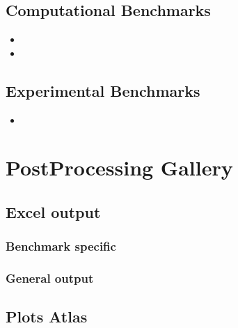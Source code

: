 \documentclass[letterpaper,10pt,english]{sphinxmanual}
\begin{document}
\section{Computational Benchmarks}
\label{\detokenize{benchmarks/benchmarks:computational-benchmarks}}\begin{itemize}
\item {} 

\item {} 

\end{itemize}


\section{Experimental Benchmarks}
\label{\detokenize{benchmarks/benchmarks:experimental-benchmarks}}\begin{itemize}
\item {} 

\end{itemize}


\chapter{Post\sphinxhyphen{}Processing Gallery}
\label{\detokenize{usage/postprocessing:post-processing-gallery}}\label{\detokenize{usage/postprocessing::doc}}

\section{Excel output}
\label{\detokenize{usage/postprocessing:excel-output}}

\subsection{Benchmark specific}
\label{\detokenize{usage/postprocessing:benchmark-specific}}

\subsection{General output}
\label{\detokenize{usage/postprocessing:general-output}}

\section{Plots Atlas}
\label{\detokenize{usage/postprocessing:plots-atlas}}\label{\detokenize{usage/postprocessing:plotstyles}}
\end{document}
